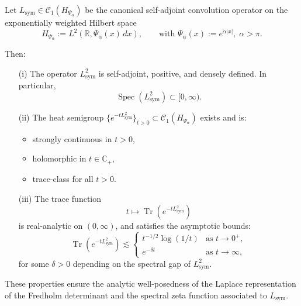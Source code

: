 \begin{lemma}
\label{lem:heat_semigroup_existence}
Let \( L_{\mathrm{sym}} \in \mathcal{C}_1(H_{\Psi_\alpha}) \) be the canonical self-adjoint convolution operator on the exponentially weighted Hilbert space
\[
H_{\Psi_\alpha} := L^2(\mathbb{R}, \Psi_\alpha(x)\, dx), \qquad \text{with } \Psi_\alpha(x) := e^{\alpha |x|},\; \alpha > \pi.
\]

Then:
\begin{enumerate}
  \item[\textnormal{(i)}] The operator \( L_{\mathrm{sym}}^2 \) is self-adjoint, positive, and densely defined. In particular,
  \[
  \operatorname{Spec}(L_{\mathrm{sym}}^2) \subset [0, \infty).
  \]

  \item[\textnormal{(ii)}] The heat semigroup \( \{e^{-t L_{\mathrm{sym}}^2}\}_{t > 0} \subset \mathcal{C}_1(H_{\Psi_\alpha}) \) exists and is:
  \begin{itemize}
    \item strongly continuous in \( t > 0 \),
    \item holomorphic in \( t \in \mathbb{C}_+ \),
    \item trace-class for all \( t > 0 \).
  \end{itemize}

  \item[\textnormal{(iii)}] The trace function
  \[
  t \mapsto \operatorname{Tr}(e^{-t L_{\mathrm{sym}}^2})
  \]
  is real-analytic on \( (0, \infty) \), and satisfies the asymptotic bounds:
  \[
  \operatorname{Tr}(e^{-t L_{\mathrm{sym}}^2}) \lesssim
  \begin{cases}
    t^{-1/2} \log(1/t) & \text{as } t \to 0^+, \\
    e^{-\delta t} & \text{as } t \to \infty,
  \end{cases}
  \]
  for some \( \delta > 0 \) depending on the spectral gap of \( L_{\mathrm{sym}}^2 \).
\end{enumerate}

\medskip
\noindent
These properties ensure the analytic well-posedness of the Laplace representation of the Fredholm determinant and the spectral zeta function associated to \( L_{\mathrm{sym}} \).
\end{lemma}
